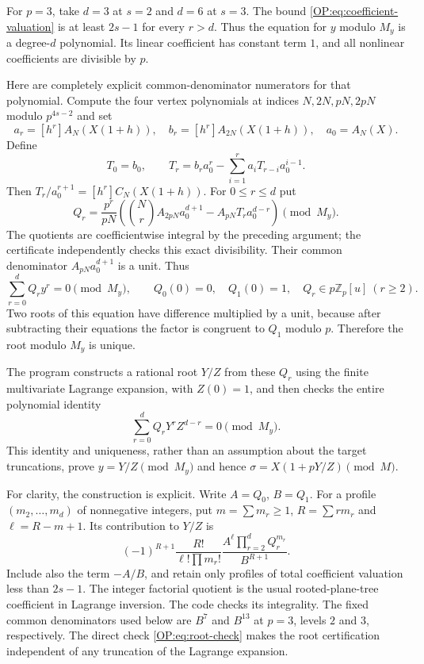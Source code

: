 \documentclass[11pt,a4paper]{article}
\theoremstyle{definition}\newtheorem{definition}[theorem]{Definition}
\theoremstyle{remark}\newtheorem{remark}[theorem]{Remark}
\newcommand{\Z}{\mathbb Z}
\numberwithin{equation}{section}
\begin{document}
For $p=3$, take $d=3$ at $s=2$ and $d=6$ at $s=3$.
The bound \eqref{OP:eq:coefficient-valuation} is at least $2s-1$ for every
$r>d$. Thus the equation for $y$ modulo $M_y$ is a degree-$d$ polynomial.
Its linear coefficient has constant term $1$, and all nonlinear
coefficients are divisible by $p$.

Here are completely explicit common-denominator numerators for that
polynomial. Compute the four vertex polynomials at indices
$N,2N,pN,2pN$ modulo $p^{4s-2}$ and set
\[
 a_r=[h^r]A_N(X(1+h)),\quad b_r=[h^r]A_{2N}(X(1+h)),
 \quad a_0=A_N(X).
\]
Define
\[
 T_0=b_0,\qquad
 T_r=b_ra_0^r-\sum_{i=1}^r a_iT_{r-i}a_0^{i-1}.
\]
Then $T_r/a_0^{r+1}=[h^r]C_N(X(1+h))$. For $0\le r\le d$ put
\begin{equation}\label{OP:eq:Qs}
 Q_r=\frac{p^r}{pN}
 \left(\binom Nr A_{2pN}a_0^{d+1}
             -A_{pN}T_ra_0^{d-r}\right)\pmod{M_y}.
\end{equation}
The quotients are coefficientwise integral by the preceding argument;
the certificate independently checks this exact divisibility.
Their common denominator $A_{pN}a_0^{d+1}$ is a unit. Thus
\begin{equation}\label{OP:eq:Hensel}
 \sum_{r=0}^d Q_r y^r=0\pmod{M_y},\qquad
 Q_0(0)=0,\quad Q_1(0)=1,\quad Q_r\in p\Z_p[u]\ (r\ge2).
\end{equation}
Two roots of this equation have difference multiplied by a unit,
because after subtracting their equations the factor is congruent to
$Q_1$ modulo $p$. Therefore the root modulo $M_y$ is unique.

The program constructs a rational root $Y/Z$ from these $Q_r$ using
the finite multivariate Lagrange expansion, with $Z(0)=1$, and then
checks the entire polynomial identity
\begin{equation}\label{OP:eq:root-check}
 \sum_{r=0}^d Q_rY^r Z^{d-r}=0\pmod{M_y}.
\end{equation}
This identity and uniqueness, rather than an assumption about the
target truncations, prove $y=Y/Z\pmod{M_y}$ and hence
$\sigma=X(1+pY/Z)\pmod M$.

For clarity, the construction is explicit. Write $A=Q_0$, $B=Q_1$.
For a profile $(m_2,\ldots,m_d)$ of nonnegative integers, put
$m=\sum m_r\ge1$, $R=\sum r m_r$ and $\ell=R-m+1$. Its contribution to
$Y/Z$ is
\[
 (-1)^{R+1}\frac{R!}{\ell!\prod m_r!}
 \frac{A^\ell\prod_{r=2}^d Q_r^{m_r}}{B^{R+1}}.
\]
Include also the term $-A/B$, and retain only profiles of total
coefficient valuation less than $2s-1$.
The integer factorial quotient is the usual rooted-plane-tree
coefficient in Lagrange inversion. The code checks its integrality.
The fixed common denominators used below are $B^7$ and $B^{13}$ at $p=3$, levels $2$ and $3$, respectively.
The direct check \eqref{OP:eq:root-check} makes the root certification
independent of any truncation of the Lagrange expansion.
\end{document}
